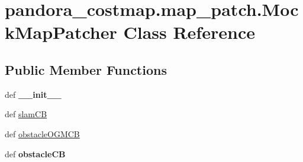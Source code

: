 \hypertarget{classpandora__costmap_1_1map__patch_1_1_mock_map_patcher}{\section{pandora\-\_\-costmap.\-map\-\_\-patch.\-Mock\-Map\-Patcher \-Class \-Reference}
\label{classpandora__costmap_1_1map__patch_1_1_mock_map_patcher}
}
\subsection*{\-Public \-Member \-Functions}
\begin{DoxyCompactItemize}
\item 
\hypertarget{classpandora__costmap_1_1map__patch_1_1_mock_map_patcher_ab182dff80ae9af17012c919904eb129e}{def {\bfseries \-\_\-\-\_\-init\-\_\-\-\_\-}}\label{classpandora__costmap_1_1map__patch_1_1_mock_map_patcher_ab182dff80ae9af17012c919904eb129e}

\item 
def \hyperlink{classpandora__costmap_1_1map__patch_1_1_mock_map_patcher_a313efc95cd93452d34fdcbd3c5987aad}{slam\-C\-B}
\item 
def \hyperlink{classpandora__costmap_1_1map__patch_1_1_mock_map_patcher_a832794e3c8a53a2ca911cfc4d10af741}{obstacle\-O\-G\-M\-C\-B}
\item 
\hypertarget{classpandora__costmap_1_1map__patch_1_1_mock_map_patcher_acc46eaa5d81b06fd7cb141f064795706}{def {\bfseries obstacle\-C\-B}}\label{classpandora__costmap_1_1map__patch_1_1_mock_map_patcher_acc46eaa5d81b06fd7cb141f064795706}

\end{DoxyCompactItemize}
